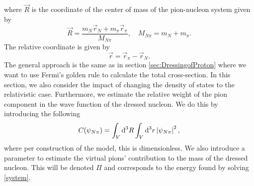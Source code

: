 where $\vec{R}$ is the coordinate of the center of mass of the pion-nucleon system given by
\begin{equation} \label{Rvec}
	\vec{R}=\frac{m_N \vec{r}_N+m_\pi \vec{r}_\pi}{M_{N\pi}}, \quad M_{N\pi} = m_N+m_\pi.
\end{equation}
The relative coordinate is given by
\begin{equation} \label{rvec}
	\vec{r} = \vec{r}_\pi-\vec{r}_N.
\end{equation}
The general approach is the same as in section \ref{sec:DressingofProton} where we want to use Fermi's golden rule to calculate the total cross-section. In this section, we also consider the impact of changing the density of states to the relativistic case. Furthermore, we estimate the relative weight of the pion component in the wave function of the dressed nucleon. We do this by introducing the following
\begin{equation} \label{relativeweight}
	C(\psi_{N\pi}) = \int_V \text{d}^3 R \int_V \text{d}^3 r \, \abs{\psi_{N\pi}}^2,
\end{equation}
where per construction of the model, this is dimensionless. We also introduce a parameter to estimate the virtual pions' contribution to the mass of the dressed nucleon. This will be denoted $\Pi$ and corresponds to the energy found by solving \eqref{system}.

